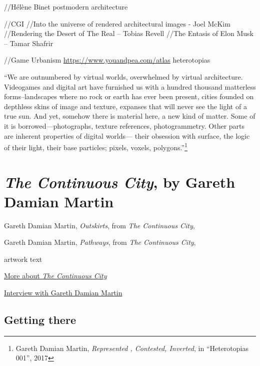 \documentclass[
  openany]{book}
\begin{document}
//Hélène Binet postmodern architecture

//CGI
//Into the universe of rendered architectural images - Joel McKim
//Rendering the Desert of The Real -- Tobias Revell
//The Entasis of Elon Musk -- Tamar Shafrir

//Game Urbanism
\url{https://www.youandpea.com/atlas}
heterotopias

``We are outnumbered by virtual worlds, overwhelmed by virtual architecture. Videogames and digital art have furnished us with a hundred thousand matterless forms--landscapes where no rock or earth has ever been present, cities founded on depthless skins of image and texture, expanses that will never see the light of a true sun.
And yet, somehow there is material here, a new kind of matter. Some of it is borrowed---photographs, texture references, photogrammetry. Other parts are inherent properties of digital worlds--- their obsession with surface, the logic of their light, their base particles; pixels, voxels, polygons.''\footnote{Gareth Damian Martin, \emph{Represented , Contested, Inverted}, in ``Heterotopias 001'', 2017}

\hypertarget{the-continuous-city-by-gareth-damian-martin}{%
\section*{\texorpdfstring{\emph{The Continuous City}, by Gareth Damian Martin}{The Continuous City, by Gareth Damian Martin}}\label{the-continuous-city-by-gareth-damian-martin}}

Gareth Damian Martin, \emph{Outskirts}, from \emph{The Continuous City},

Gareth Damian Martin, \emph{Pathways}, from \emph{The Continuous City},

artwork text

\href{https://socks-studio.com/2019/10/13/gareth-damian-martin-postcards-from-the-continuous-city-2018/}{More about \emph{The Continuous City}}

\href{https://www.gamescenes.org/2018/04/interview-gareth-damian-martin-the-aesthetics-of-analogue-game-photography.html}{Interview with Gareth Damian Martin}

\hypertarget{getting-there}{%
\subsection*{Getting there}\label{getting-there}}
\end{document}
